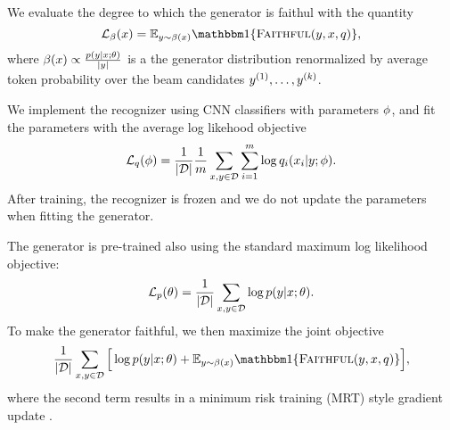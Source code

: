 We evaluate the degree to which the generator is faithul with the quantity
\[ \objective_\beamDistr(\evidence) = \E_{\utterance \sim \beamDistr(\evidence)} 
 \Ind{\faithful(\utterance, \evidence, \rec)}, \]
where $\beta(x) \propto \frac{p(y|x;\theta)}{|y|}$ is a the generator distribution renormalized by average token
probability over the
beam candidates $y^{(1)},\ldots, y^{(k)}$.

We implement the recognizer using CNN classifiers with parameters $\phi$,
 and fit the parameters  with 
the average log likehood objective \[ \mathcal{L}_q(\phi) = 
\frac{1}{|\mathcal{D}|} \frac{1}{m} \sum_{x, y \in \mathcal{D}} \sum_{i=1}^m 
\log q_i(x_i|y;\phi).\] After training, the 
recognizer is frozen and we do not update the parameters when fitting the 
generator.

The generator is pre-trained also using the standard maximum log likelihood
objective: \[\mathcal{L}_p(\theta) = 
\frac{1}{|\mathcal{D}|} \sum_{x, y \in \mathcal{D}} 
\log p(y|x;\theta).\] To make the generator faithful,
we then maximize the joint objective \[
\frac{1}{|\dataset|} \sum_{\evidence, \utterance \in \dataset} 
\Big[
\log \gen(\utterance|\evidence;\genParams) + 
 \E_{\utterance \sim \beamDistr(\evidence)} 
 \Ind{\faithful(\utterance, \evidence, \rec)} \Big], 
\]
where the second term results in a minimum risk training (MRT) style gradient
update \citep{edunov2018classical}.


